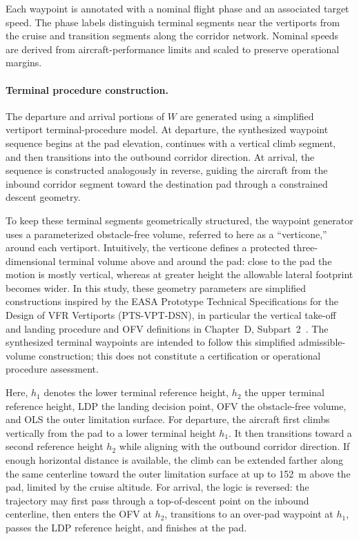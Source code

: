 Each waypoint is annotated with a nominal flight phase and an associated target speed. The phase labels distinguish terminal segments near the vertiports from the cruise and transition segments along the corridor network. Nominal speeds are derived from aircraft-performance limits and scaled to preserve operational margins.

\paragraph{Terminal procedure construction.}
The departure and arrival portions of \(W\) are generated using a simplified vertiport terminal-procedure model. At departure, the synthesized waypoint sequence begins at the pad elevation, continues with a vertical climb segment, and then transitions into the outbound corridor direction. At arrival, the sequence is constructed analogously in reverse, guiding the aircraft from the inbound corridor segment toward the destination pad through a constrained descent geometry.

To keep these terminal segments geometrically structured, the waypoint generator uses a parameterized obstacle-free volume, referred to here as a ``verticone,'' around each vertiport. Intuitively, the verticone defines a protected three-dimensional terminal volume above and around the pad: close to the pad the motion is mostly vertical, whereas at greater height the allowable lateral footprint becomes wider. In this study, these geometry parameters are simplified constructions inspired by the EASA Prototype Technical Specifications for the Design of VFR Vertiports (PTS-VPT-DSN), in particular the vertical take-off and landing procedure and OFV definitions in Chapter~D, Subpart~2~\cite{easa2022_pts_vpt_dsn}. The synthesized terminal waypoints are intended to follow this simplified admissible-volume construction; this does not constitute a certification or operational procedure assessment.

Here, \(h_1\) denotes the lower terminal reference height, \(h_2\) the upper terminal reference height, LDP the landing decision point, OFV the obstacle-free volume, and OLS the outer limitation surface. For departure, the aircraft first climbs vertically from the pad to a lower terminal height \(h_1\). It then transitions toward a second reference height \(h_2\) while aligning with the outbound corridor direction. If enough horizontal distance is available, the climb can be extended farther along the same centerline toward the outer limitation surface at up to \SI{152}{m} above the pad, limited by the cruise altitude. For arrival, the logic is reversed: the trajectory may first pass through a top-of-descent point on the inbound centerline, then enters the OFV at \(h_2\), transitions to an over-pad waypoint at \(h_1\), passes the LDP reference height, and finishes at the pad.

